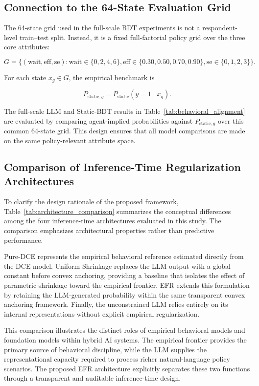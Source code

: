 \documentclass[11pt]{article}
\begin{document}
\subsection{Connection to the 64-State Evaluation Grid}

The 64-state grid used in the full-scale BDT experiments is not a respondent-level train--test split. Instead, it is a fixed full-factorial policy grid over the three core attributes:

\[
G
=
\{(\text{wait}, \text{eff}, \text{se}) :
\text{wait} \in \{0,2,4,6\},
\text{eff} \in \{0.30,0.50,0.70,0.90\},
\text{se} \in \{0,1,2,3\}
\}.
\]

For each state \(x_g \in G\), the empirical benchmark is

\[
P_{\text{static},g}
=
P_{\text{static}}(y=1 \mid x_g).
\]

The full-scale LLM and Static-BDT results in Table~\ref{tab:behavioral_alignment} are evaluated by comparing agent-implied probabilities against \(P_{\text{static},g}\) over this common 64-state grid. This design ensures that all model comparisons are made on the same policy-relevant attribute space.

\subsection{Comparison of Inference-Time Regularization Architectures}
\label{app:architecture_comparison}

To clarify the design rationale of the proposed framework, Table~\ref{tab:architecture_comparison} summarizes the conceptual differences among the four inference-time architectures evaluated in this study. The comparison emphasizes architectural properties rather than predictive performance.

Pure-DCE represents the empirical behavioral reference estimated directly from the DCE model. Uniform Shrinkage replaces the LLM output with a global constant before convex anchoring, providing a baseline that isolates the effect of parametric shrinkage toward the empirical frontier. EFR extends this formulation by retaining the LLM-generated probability within the same transparent convex anchoring framework. Finally, the unconstrained LLM relies entirely on its internal representations without explicit empirical regularization.

This comparison illustrates the distinct roles of empirical behavioral models and foundation models within hybrid AI systems. The empirical frontier provides the primary source of behavioral discipline, while the LLM supplies the representational capacity required to process richer natural-language policy scenarios. The proposed EFR architecture explicitly separates these two functions through a transparent and auditable inference-time design.
\end{document}
